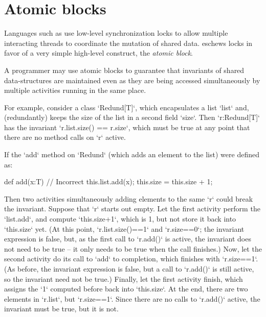 \section{Atomic blocks}\label{AtomicBlocks}
Languages such as \java{} use low-level synchronization locks to allow
multiple interacting threads to coordinate the mutation of shared
data. \Xten{} eschews locks in favor of a very simple high-level
construct, the {\em atomic block}.

A programmer may use atomic blocks to guarantee that invariants of
shared data-structures are maintained even as they are being accessed
simultaneously by multiple activities running in the same place.  

For example, consider a class \xcd`Redund[T]`, which encapsulates a list
\xcd`list` and, (redundantly) keeps the size of the list in a second field
\xcd`size`.  Then \xcd`r:Redund[T]` has the invariant 
\xcd`r.list.size() == r.size`, which must be true at any point that there are
no method calls on \xcd`r` active.

If the \xcd`add` method on \xcd`Redund` (which adds an element to the list) 
were defined as: 
\begin{xten}
def add(x:T) { // Incorrect
  this.list.add(x);
  this.size = this.size + 1;
}
\end{xten}
Then two activities simultaneously adding elements to the same \xcd`r` could break the
invariant.  Suppose that \xcd`r` starts out empty.  Let the first activity
perform the \xcd`list.add`, and compute \xcd`this.size+1`, which is 1, but not store it
back into \xcd`this.size` yet.  
(At this point, \xcd`r.list.size()==1` and \xcd`r.size==0`; the invariant
expression is false, but, as the first call to \xcd`r.add()` is active, the
invariant does not need to be true -- it only needs to be true when the
call finishes.)
Now, let the second activity do its call to
\xcd`add` to completion, which finishes with \xcd`r.size==1`.  
(As before, the invariant expression is false, but a call to \xcd`r.add()` is
still active, so the invariant need not be true.)
Finally, let
the first activity finish, which assigns the \xcd`1` computed before back into
\xcd`this.size`.  At the end, there are two elements in \xcd`r.list`, but
\xcd`r.size==1`. Since there are no calls to \xcd`r.add()` active, the
invariant must be true, but it is not.

